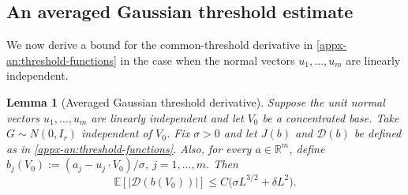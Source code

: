 \documentclass[11pt,letterpaper]{article}
\newtheorem{lemma}{Lemma}
\theoremstyle{remark}
\newcommand{\E}{\mathbb E}
\newcommand{\R}{\mathbb R}
\begin{document}
\subsection{An averaged Gaussian threshold estimate}
\label{appx-an:sec:threshold}
\begingroup
We now derive a bound for the common-threshold derivative in
\eqref{appx-an:threshold-functions} in the case when the normal vectors $u_1,\dots, u_m$ are linearly independent.

\begin{lemma}[Averaged Gaussian threshold derivative]
\label{appx-an:lem:threshold}
Suppose the unit normal vectors $u_1,\dots, u_m$ are linearly independent and let \(V_0\) be a
concentrated base. Take \(G\sim N(0,I_r)\) independent of \(V_0\). Fix \(\sigma>0\) and let $J(b)$ and $\mathcal D(b)$ be defined as in \eqref{appx-an:threshold-functions}.
Also, for every \(a\in\R^m\), {define}
\(b_j(V_0):=(a_j-u_j\cdot V_0)/\sigma\), $j=1,\dots, m$. Then
\begin{equation}
 \E[|\mathcal D(b(V_0))|]
 \le C\bigl(\sigma L^{3/2}+\delta L^2\bigr).
 \label{appx-an:threshold-bound}
\end{equation}
\end{lemma}
\end{document}
